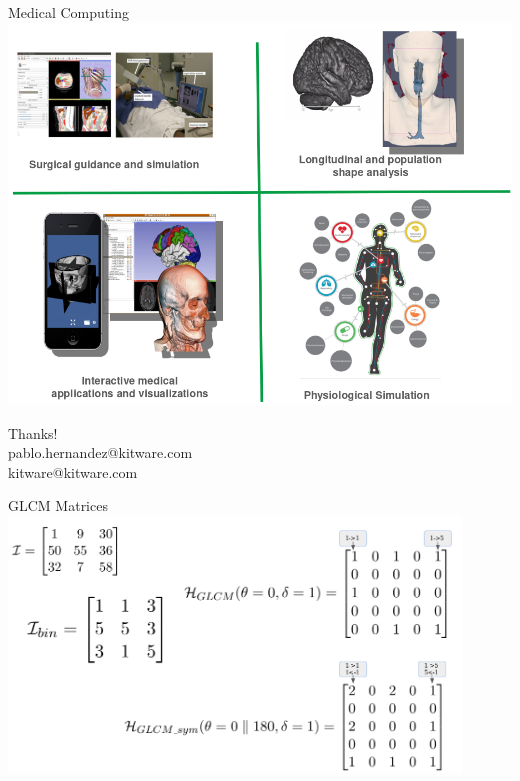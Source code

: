 \documentclass[10pt,aspectratio=169]{beamer}
\begin{document}
{{
\begin{frame}{Medical Computing}
    \centering
    \includegraphics[height=0.9\textheight]{./logos/kitware_medical.png}
\end{frame}
}

\begin{frame}[standout]
  \centering
  {\huge Thanks!}\\
  pablo.hernandez@kitware.com\\
  kitware@kitware.com
  \vspace{1cm}
\end{frame}

\appendix

{
\begin{frame}[fragile]{GLCM Matrices}
  \centering
  \includegraphics[width=0.9\textwidth]{./figures/GLCM_matrices.png}
\end{frame}

}}
\end{document}
